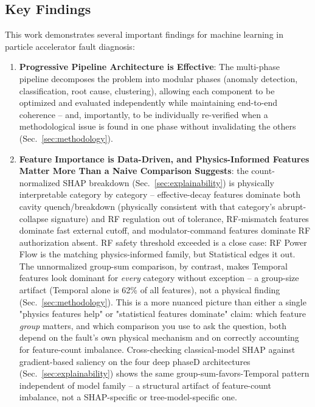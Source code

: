 
\label{sec:discussion}

\subsection{Key Findings}

This work demonstrates several important findings for machine learning in particle accelerator fault diagnosis:

\begin{enumerate}
    \item \textbf{Progressive Pipeline Architecture is Effective}: The multi-phase pipeline decomposes the problem into modular phases (anomaly detection, classification, root cause, clustering), allowing each component to be optimized and evaluated independently while maintaining end-to-end coherence -- and, importantly, to be individually re-verified when a methodological issue is found in one phase without invalidating the others (Sec.~\ref{sec:methodology}).

    \item \textbf{Feature Importance is Data-Driven, and Physics-Informed Features Matter More Than a Naive Comparison Suggests}: the count-normalized SHAP breakdown (Sec.~\ref{sec:explainability}) is physically interpretable category by category -- effective-decay features dominate both cavity quench/breakdown (physically consistent with that category's abrupt-collapse signature) and RF regulation out of tolerance, RF-mismatch features dominate fast external cutoff, and modulator-command features dominate RF authorization absent. RF safety threshold exceeded is a close case: RF Power Flow is the matching physics-informed family, but Statistical edges it out. The unnormalized group-sum comparison, by contrast, makes Temporal features look dominant for \emph{every} category without exception -- a group-size artifact (Temporal alone is 62\% of all features), not a physical finding (Sec.~\ref{sec:methodology}). This is a more nuanced picture than either a single "physics features help" or "statistical features dominate" claim: which feature \emph{group} matters, and which comparison you use to ask the question, both depend on the fault's own physical mechanism and on correctly accounting for feature-count imbalance. Cross-checking classical-model SHAP against gradient-based saliency on the four deep phaseD architectures (Sec.~\ref{sec:explainability}) shows the same group-sum-favors-Temporal pattern independent of model family -- a structural artifact of feature-count imbalance, not a SHAP-specific or tree-model-specific one.


\end{enumerate}
